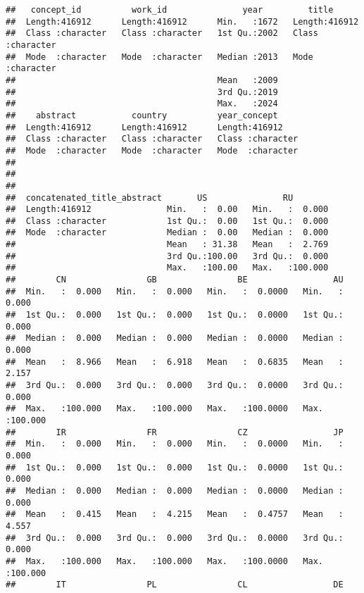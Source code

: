 \documentclass[
]{article}
\begin{document}
\begin{verbatim}
##   concept_id          work_id               year         title          
##  Length:416912      Length:416912      Min.   :1672   Length:416912     
##  Class :character   Class :character   1st Qu.:2002   Class :character  
##  Mode  :character   Mode  :character   Median :2013   Mode  :character  
##                                        Mean   :2009                     
##                                        3rd Qu.:2019                     
##                                        Max.   :2024                     
##    abstract           country          year_concept      
##  Length:416912      Length:416912      Length:416912     
##  Class :character   Class :character   Class :character  
##  Mode  :character   Mode  :character   Mode  :character  
##                                                          
##                                                          
##                                                          
##  concatenated_title_abstract       US               RU         
##  Length:416912               Min.   :  0.00   Min.   :  0.000  
##  Class :character            1st Qu.:  0.00   1st Qu.:  0.000  
##  Mode  :character            Median :  0.00   Median :  0.000  
##                              Mean   : 31.38   Mean   :  2.769  
##                              3rd Qu.:100.00   3rd Qu.:  0.000  
##                              Max.   :100.00   Max.   :100.000  
##        CN                GB                BE                 AU         
##  Min.   :  0.000   Min.   :  0.000   Min.   :  0.0000   Min.   :  0.000  
##  1st Qu.:  0.000   1st Qu.:  0.000   1st Qu.:  0.0000   1st Qu.:  0.000  
##  Median :  0.000   Median :  0.000   Median :  0.0000   Median :  0.000  
##  Mean   :  8.966   Mean   :  6.918   Mean   :  0.6835   Mean   :  2.157  
##  3rd Qu.:  0.000   3rd Qu.:  0.000   3rd Qu.:  0.0000   3rd Qu.:  0.000  
##  Max.   :100.000   Max.   :100.000   Max.   :100.0000   Max.   :100.000  
##        IR                FR                CZ                 JP         
##  Min.   :  0.000   Min.   :  0.000   Min.   :  0.0000   Min.   :  0.000  
##  1st Qu.:  0.000   1st Qu.:  0.000   1st Qu.:  0.0000   1st Qu.:  0.000  
##  Median :  0.000   Median :  0.000   Median :  0.0000   Median :  0.000  
##  Mean   :  0.415   Mean   :  4.215   Mean   :  0.4757   Mean   :  4.557  
##  3rd Qu.:  0.000   3rd Qu.:  0.000   3rd Qu.:  0.0000   3rd Qu.:  0.000  
##  Max.   :100.000   Max.   :100.000   Max.   :100.0000   Max.   :100.000  
##        IT                PL                CL                 DE         

\end{verbatim}
\end{document}
